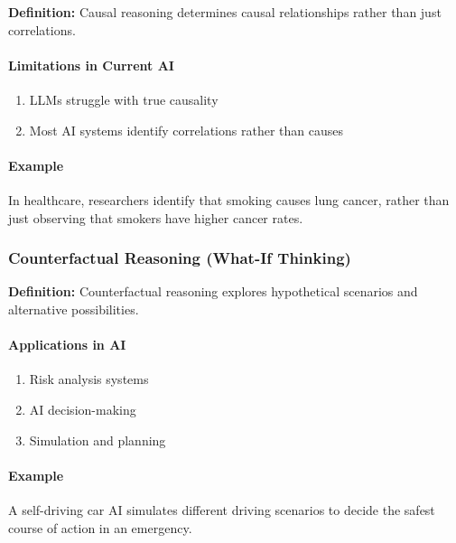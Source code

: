 \textbf{Definition:} Causal reasoning determines causal relationships rather than just correlations.

\paragraph{Limitations in Current AI}
\label{para:causal-limitations}

\begin{enumerate}
\item LLMs struggle with true causality
\item Most AI systems identify correlations rather than causes
\end{enumerate}

\paragraph{Example}
\label{para:causal-example}

In healthcare, researchers identify that smoking causes lung cancer, rather than just observing that smokers have higher cancer rates.

\subsubsection{Counterfactual Reasoning (What-If Thinking)}
\label{subsubsec:counterfactual-reasoning}

\textbf{Definition:} Counterfactual reasoning explores hypothetical scenarios and alternative possibilities.

\paragraph{Applications in AI}
\label{para:counterfactual-applications}

\begin{enumerate}
\item Risk analysis systems
\item AI decision-making
\item Simulation and planning
\end{enumerate}

\paragraph{Example}
\label{para:counterfactual-example}

A self-driving car AI simulates different driving scenarios to decide the safest course of action in an emergency.

